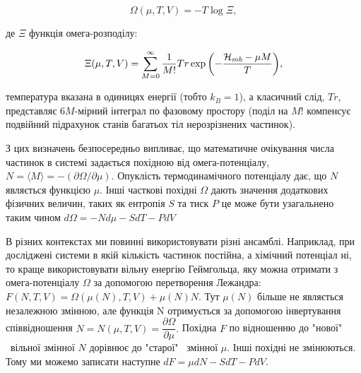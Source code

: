 \begin{equation}
\label{eqn:omegapotential}
	\Omega(\mu,T,V) = -T\log\Xi,
\end{equation}
 
де $\Xi$ функція омега-розподілу:

\begin{equation}
\label{eqn:sgranddistr}
	\Xi(\mu, T, V) = \sum\limits_{M = 0}^\infty\frac{1}{M!}Tr\exp{\left(-\frac{{\cal H}_{mb} - {\mu} M}{T}\right)},
\end{equation}

температура вказана в одиницях енергії (тобто $k_{B} = 1$), а класичний слід, $Tr$, представляє $6M$-мірний інтеграл по фазовому простору (поділ на $M!$ компенсує подвійний підрахунок станів багатьох тіл нерозрізнених частинок). 

З цих визначень безпосередньо випливає, що математичне очікування числа частинок в системі задається похідною від омега-потенціалу, $N = \langle M \rangle = -(\partial{\Omega}/\partial{\mu})$. Опуклість термодинамічного потенціалу \cite{convexfreeenerg} дає, що $N$ являється функцією $\mu$. Інші часткові похідні $\Omega$ дають значення додаткових фізичних величин, таких як ентропія $S$ та тиск $P$ це може бути узагальнено таким чином $d\Omega = -Nd\mu - SdT - PdV$

В різних контекстах ми повинні використовувати різні ансамблі. Наприклад, при досліджені системи в якій кількість частинок постійна, а хімічний потенціал ні, то краще використовувати вільну енергію Геймгольца, яку можна отримати з омега-потенціалу $\Omega$ за допомогою перетворення Лежандра: $F(N,T,V) = \Omega(\mu(N),T,V)+\mu(N)N.$
Тут $\mu(N)$ більше не являється незалежною змінною, але функція N отримується за допомогою інвертування співвідношення $N = N({\mu},T,V)=\dfrac{\partial\Omega}{\partial\mu}.$ Похідна $F$ по відношенню до "нової" \ вільної змінної $N$ дорівнює до "старої" \ змінної $\mu$. Інші похідні не змінюються. Тому ми можемо записати наступне $dF={\mu}dN - SdT - PdV$.

